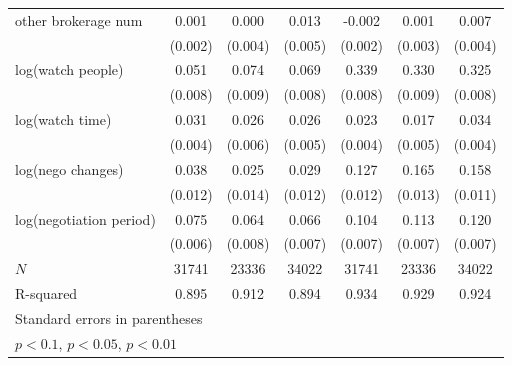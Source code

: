 {\begin{adjustbox}{max width=\textwidth}
\begin{tabular}{l*{6}{c}}
\addlinespace
other brokerage num  &       0.001         &       0.000         &       0.013\sym{**} &      -0.002         &       0.001         &       0.007\sym{*}  \\
            &     (0.002)         &     (0.004)         &     (0.005)         &     (0.002)         &     (0.003)         &     (0.004)         \\
\addlinespace
log(watch people)&       0.051\sym{***}&       0.074\sym{***}&       0.069\sym{***}&       0.339\sym{***}&       0.330\sym{***}&       0.325\sym{***}\\
            &     (0.008)         &     (0.009)         &     (0.008)         &     (0.008)         &     (0.009)         &     (0.008)         \\
\addlinespace
log(watch time)&       0.031\sym{***}&       0.026\sym{***}&       0.026\sym{***}&       0.023\sym{***}&       0.017\sym{***}&       0.034\sym{***}\\
            &     (0.004)         &     (0.006)         &     (0.005)         &     (0.004)         &     (0.005)         &     (0.004)         \\
\addlinespace
log(nego changes)&       0.038\sym{***}&       0.025\sym{*}  &       0.029\sym{**} &       0.127\sym{***}&       0.165\sym{***}&       0.158\sym{***}\\
            &     (0.012)         &     (0.014)         &     (0.012)         &     (0.012)         &     (0.013)         &     (0.011)         \\
\addlinespace
log(negotiation period)&       0.075\sym{***}&       0.064\sym{***}&       0.066\sym{***}&       0.104\sym{***}&       0.113\sym{***}&       0.120\sym{***}\\
            &     (0.006)         &     (0.008)         &     (0.007)         &     (0.007)         &     (0.007)         &     (0.007)         \\
\midrule
\(N\)       &       31741         &       23336         &       34022         &       31741         &       23336         &       34022         \\
R-squared   &       0.895         &       0.912         &       0.894         &       0.934         &       0.929         &       0.924         \\
\bottomrule
\multicolumn{7}{l}{\footnotesize Standard errors in parentheses}\\
\multicolumn{7}{l}{\footnotesize \sym{*} \(p<0.1\), \sym{**} \(p<0.05\), \sym{***} \(p<0.01\)}\\
\end{tabular}
\end{adjustbox}
}
